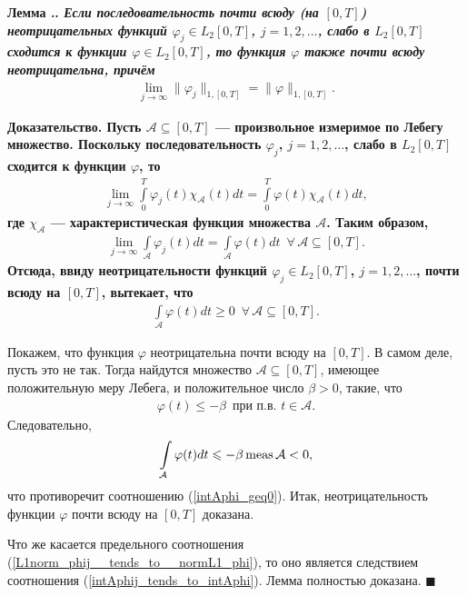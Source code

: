 \documentclass{report}
\newcounter{lem}[section]
\renewcommand{\thelem}{\thesection.\arabic{lem}}
\newenvironment{Lemma}{\par\refstepcounter{lem}\bf Лемма \thelem. \it}{\rm\par}
\newenvironment{Proof}{\par\noindent\bf Доказательство.\rm}{ $\blacksquare$\par}
\newcommand{\meas}{\mathop{\rm meas}\nolimits}
\begin{document}
\begin{Lemma}
Если последовательность почти всюду (на $[0,T]$) неотрицательных функций $\varphi_j\in L_2[0,T]$, $j=1,2,\dots$, слабо в $L_2[0,T]$ сходится к функции $\varphi\in L_2[0,T]$, то функция
$\varphi$ также почти всюду неотрицательна, причём
\begin{gather}\label{L1norm_phij__tends_to__normL1_phi}
\lim\limits_{j\to\infty}\|\varphi_j\|_{1,[0,T]}=\|\varphi\|_{1,[0,T]}.
\end{gather}
\end{Lemma}
\begin{Proof}
Пусть $\mathcal{A}\subseteq[0,T]$ --- произвольное измеримое по Лебегу множество. Поскольку последовательность $\varphi_j$, $j=1,2,\dots$, слабо в $L_2[0,T]$ сходится к функции $\varphi$,
то
\begin{gather*}
\lim\limits_{j\to\infty}\int\limits_0^T\varphi_j(t)\chi_{\mathcal{A}}(t)dt=\int\limits_0^T\varphi(t)\chi_{\mathcal{A}}(t)dt,
\end{gather*}
где $\chi_{\mathcal{A}}$ --- характеристическая функция множества $\mathcal{A}$. Таким образом,
\begin{gather}\label{intAphij_tends_to_intAphi}
\lim\limits_{j\to\infty}\int\limits_{\mathcal{A}}\varphi_j(t)dt=\int\limits_{\mathcal{A}}\varphi(t)dt\,\,\,\forall\,\mathcal{A}\subseteq[0,T].
\end{gather}
Отсюда, ввиду неотрицательности функций $\varphi_j\in L_2[0,T]$, $j=1,2,\dots$, почти всюду на $[0,T]$, вытекает, что
\begin{gather}\label{intAphi_geq0}
\int\limits_{\mathcal{A}}\varphi(t)dt\geqslant0\,\,\,\forall\,\mathcal{A}\subseteq[0,T].
\end{gather}

Покажем, что функция $\varphi$ неотрицательна почти всюду на $[0,T]$. В самом деле, пусть это не так. Тогда найдутся множество $\mathcal{A}\subseteq[0,T]$, имеющее положительную меру
Лебега, и положительное число $\beta>0$, такие, что
\begin{gather*}
\varphi(t)\leqslant-\beta\,\,\,\text{при п.в. $t\in\mathcal{A}$.}
\end{gather*}
Следовательно,
\begin{gather*}
\int\limits_{\mathcal{A}}\varphi(t)dt\leqslant-\beta\meas\mathcal{A}<0,
\end{gather*}
что противоречит соотношению (\ref{intAphi_geq0}). Итак, неотрицательность функции $\varphi$ почти всюду на $[0,T]$ доказана.

Что же касается предельного соотношения (\ref{L1norm_phij__tends_to__normL1_phi}), то оно является следствием соотношения (\ref{intAphij_tends_to_intAphi}). Лемма полностью доказана.
\end{Proof}
\end{document}
